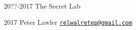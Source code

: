 
\begin{DoxyItemize}
\item 20??-\/2017 The Secret Lab
\item 2017 Peter Lawler \href{mailto:relwalretep@gmail.com}{\tt relwalretep@gmail.\-com} 
\end{DoxyItemize}